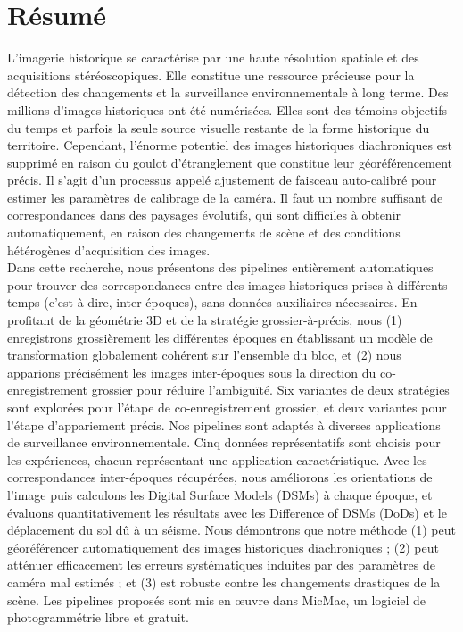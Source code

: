 \documentclass[a4paper,11pt,twoside]{ThesisStyle}
\newcommand\myemptypage{
	\null
	\thispagestyle{empty}
	\addtocounter{page}{-1}
	\newpage
}
\begin{document}

\myemptypage




\setcounter{page}{0}
\cleardoublepage
\section*{Résumé}
L'imagerie historique se caractérise par une haute résolution spatiale et des acquisitions stéréoscopiques. Elle constitue une ressource précieuse pour la détection des changements et la surveillance environnementale à long terme. Des millions d'images historiques ont été numérisées. Elles sont des témoins objectifs du temps et parfois la seule source visuelle restante de la forme historique du territoire. Cependant, l'énorme potentiel des images historiques diachroniques est supprimé en raison du goulot d'étranglement que constitue leur géoréférencement précis. 
Il s'agit d'un processus appelé ajustement de faisceau auto-calibré pour estimer les paramètres de calibrage de la caméra. Il faut un nombre suffisant de correspondances dans des paysages évolutifs, qui sont difficiles à obtenir automatiquement, en raison des changements de scène et des conditions hétérogènes d'acquisition des images.\\

Dans cette recherche, nous présentons des pipelines entièrement automatiques pour trouver des correspondances entre des images historiques prises à différents temps (c'est-à-dire, inter-époques), sans données auxiliaires nécessaires. 
En profitant de la géométrie 3D et de la stratégie grossier-à-précis, nous (1) enregistrons grossièrement les différentes époques en établissant un modèle de transformation globalement cohérent sur l'ensemble du bloc, et (2) nous apparions précisément les images inter-époques sous la direction du co-enregistrement grossier pour réduire l'ambiguïté. Six variantes de deux stratégies sont explorées pour l'étape de co-enregistrement grossier, et deux variantes pour l'étape d'appariement précis. 
Nos pipelines sont adaptés à diverses applications de surveillance environnementale. Cinq données représentatifs sont choisis pour les expériences, chacun représentant une application caractéristique. 
Avec les correspondances inter-époques récupérées, nous améliorons les orientations de l'image puis calculons les Digital Surface Models (DSMs) à chaque époque, et évaluons quantitativement les résultats avec les Difference of DSMs (DoDs) et le déplacement du sol dû à un séisme. Nous démontrons que notre méthode (1) peut géoréférencer automatiquement des images historiques diachroniques ; (2) peut atténuer efficacement les erreurs systématiques induites par des paramètres de caméra mal estimés ; et (3) est robuste contre les changements drastiques de la scène. Les pipelines proposés sont mis en œuvre dans MicMac, un logiciel de photogrammétrie libre et gratuit.\\
\end{document}

